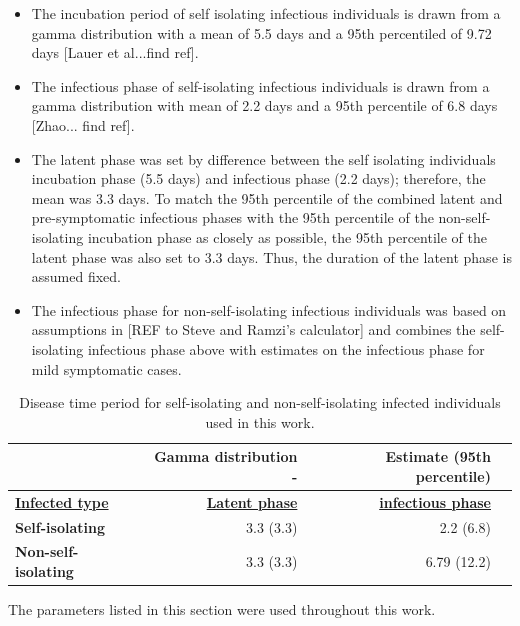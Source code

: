 \documentclass[sr]{drdc-report}
\begin{document}
\begin{itemize}
\item The incubation period of self isolating infectious individuals is drawn from a gamma distribution with a mean of 5.5 days and a 95th percentiled of 9.72 days [Lauer et al...find ref].  
\item The infectious phase of self-isolating infectious individuals is drawn from a gamma distribution with mean of 2.2 days and a 95th percentile of 6.8 days [Zhao... find ref].
\item The latent phase was set by difference between the self isolating individuals incubation phase (5.5 days) and infectious phase (2.2 days); therefore, the mean was 3.3 days. To match the 95th percentile of the combined latent and pre-symptomatic infectious phases with the 95th percentile of the non-self-isolating incubation phase as closely as possible, the 95th percentile of the latent phase was also set to 3.3 days. Thus, the duration of the latent phase is assumed fixed.  
\item The infectious phase for non-self-isolating infectious individuals was based on assumptions in [REF to Steve and Ramzi’s calculator] and combines the self-isolating infectious phase above with estimates on the infectious phase for mild symptomatic cases.
\end{itemize}

\begin{table}
\centering
\caption{Disease time period for self-isolating and non-self-isolating infected individuals used in this work.}\label{table_diseasePhase}
\begin{tabular}{lrrl}
& Gamma distribution {   } - &Estimate (95th percentile)\\
\hline
\textbf{\underline{Infected type}} & \textbf{\underline{Latent phase}} & \textbf{\underline{infectious phase}}\\
\textbf{Self-isolating} & 3.3 (3.3) & 2.2 (6.8)\\
\textbf{Non-self-isolating} & 3.3 (3.3) & 6.79 (12.2)\\
\hline
\end{tabular}
\end{table}

The parameters listed in this section were used throughout this work. 

\end{document}
